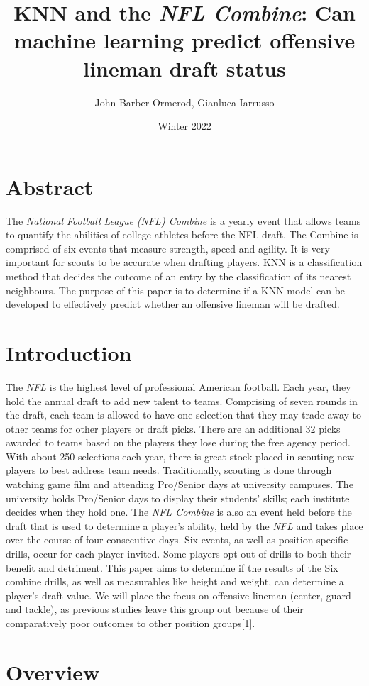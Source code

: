 \documentclass[confrence]{IEEEtran}
\title{KNN and the \textit{NFL Combine}: Can machine learning predict offensive lineman draft status}
\author{John Barber-Ormerod, Gianluca Iarrusso}
\date{Winter 2022}
\begin{document}
\maketitle
\section*{Abstract}
The \textit{National Football League (NFL) Combine} is a yearly event that allows teams to quantify the abilities of college athletes before the NFL draft.
The Combine is comprised of six events that measure strength, speed and agility.
It is very important for scouts to be accurate when drafting players.
KNN is a classification method that decides the outcome of an entry by the classification of its nearest neighbours.
The purpose of this paper is to determine if a KNN model can be developed to effectively predict whether an offensive lineman will be drafted.
\section*{Introduction}
The \textit{NFL} is the highest level of professional American football. Each year, they hold the annual draft to add new talent to teams.
Comprising of seven rounds in the draft, each team is allowed to have one selection that they may trade away to other teams for other players or draft picks.
There are an additional 32 picks awarded to teams based on the players they lose during the free agency period.
With about 250 selections each year, there is great stock placed in scouting new players to best address team needs.
Traditionally, scouting is done through watching game film and attending Pro/Senior days at university campuses.
The university holds Pro/Senior days to display their students' skills; each institute decides when they hold one.
The \textit{NFL Combine} is also an event held before the draft that is used to determine a player's ability, held by the \textit{NFL} and takes place over the course of four consecutive days. 
Six events, as well as position-specific drills, occur for each player invited.
Some players opt-out of drills to both their benefit and detriment.
This paper aims to determine if the results of the Six combine drills, as well as measurables like height and weight, can determine a player's draft value.
We will place the focus on offensive lineman (center, guard and tackle), as previous studies leave this group out because of their comparatively poor outcomes to other position groups[1].
\section*{Overview}
\end{document}
